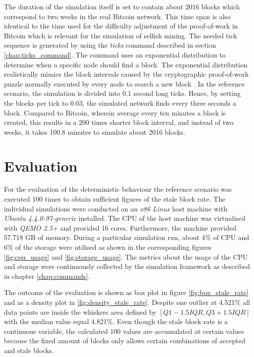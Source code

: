 The duration of the simulation itself is set to contain about 2016 blocks which correspond to two weeks in the real Bitcoin network.
This time span is also identical to the time used for the difficulty adjustment of the proof-of-work in Bitcoin which is relevant for the simulation of selfish mining. 
The needed tick sequence is generated by using the \textit{ticks} command described in section \ref{chap:ticks_command}.
The command uses an exponential distribution to determine when a specific node should find a block. 
The exponential distribution realistically mimics the block intervals caused by the cryptographic proof-of-work puzzle normally executed by every node to search a new block \cite{nakamoto2008bitcoin, decker2013information, eyal2014majority}.
In the reference scenario, the simulation is divided into 0.1 second long ticks.
Hence, by setting the blocks per tick to $0.0\dot{3}$, the simulated network finds every three seconds a block.
Compared to Bitcoin, wherein average every ten minutes a block is created, this results in a 200 times shorter block interval, and instead of two weeks, it takes 100.8 minutes to simulate about 2016 blocks.

\section{Evaluation}
\label{chap:evaluation}

For the evaluation of the deterministic behaviour the reference scenario was executed 100 times to obtain sufficient figures of the stale block rate.
The individual simulations were conducted on an \textit{x86 Linux} host machine with \textit{Ubuntu 4.4.0-97-generic} installed.
The CPU of the host machine was virtualised with \textit{QEMO 2.5+} and provided 16 cores.
Furthermore, the machine provided 57.718 GB of memory.
During a particular simulation run, about 4\% of CPU and 6\% of the storage were utilised as shown in the corresponding figures \ref{fig:cpu_usage} and \ref{fig:storage_usage}.
The metrics about the usage of the CPU and storage were continuously collected by the simulation framework as described in chapter \ref{chap:commands}.

The outcome of the evaluation is shown as box plot in figure \ref{fig:box_stale_rate} and as a density plot in \ref{fig:density_stale_rate}.
Despite one outlier at 4.521\% all data points are inside the whiskers area defined by $[Q1 - 1.5IQR, Q3 + 1.5IQR]$ with the median value equal 4.821\%.
Even though the stale block rate is a continuous variable, the calculated 100 values are accumulated at certain values because the fixed amount of blocks only allows certain combinations of accepted and stale blocks.

